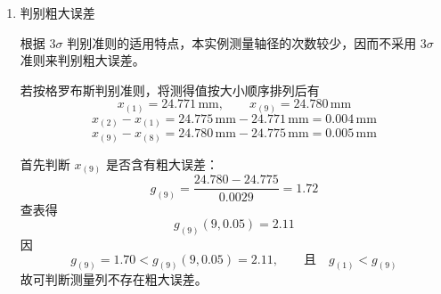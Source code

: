 \documentclass[UTF8,zihao=-4]{ctexart}
\begin{document}
\begin{enumerate}[label=\arabic*.]
    根据贝塞尔公式或别捷尔斯公式，求得测量列单次测量的标准差 $\sigma$ 为
    \begin{equation*}
        \sigma
        =
        \sqrt{\frac{\displaystyle\sum_{i=1}^{9}v_i^2}{n-1}}
        =
        \sqrt{\frac{0.000069}{8}}\,\mathrm{mm}
        =
        0.0029\,\mathrm{mm}
    \end{equation*}
    \begin{equation*}
        \sigma'
        =
        1.253
        \frac{\displaystyle\sum_{i=1}^{n}|v_i|}
        {\sqrt{n(n-1)}}
        =
        1.253\times
        \frac{0.021}{\sqrt{9\times8}}\,\mathrm{mm}
        =
        0.0031\,\mathrm{mm}
    \end{equation*}
    用两种方法计算的标准差比值为
    \begin{equation*}
        \frac{\sigma'}{\sigma}
        =
        \frac{0.0031}{0.0029}
        =
        1.069
        =
        1+u
    \end{equation*}
    \begin{equation*}
        u=0.069
    \end{equation*}
    因
    \begin{equation*}
        |u|
        =
        0.069
        <
        \frac{2}{\sqrt{n-1}}
        =
        \frac{2}{\sqrt{8}}
        \approx0.707
    \end{equation*}
    故同样可判断该测量列无系统误差存在。

    \item 判别粗大误差

    根据 $3\sigma$ 判别准则的适用特点，本实例测量轴径的次数较少，因而不采用 $3\sigma$ 准则来判别粗大误差。

    若按格罗布斯判别准则，将测得值按大小顺序排列后有
    \begin{equation*}
        x_{(1)}=24.771\,\mathrm{mm},
        \qquad
        x_{(9)}=24.780\,\mathrm{mm}
    \end{equation*}
    \begin{equation*}
        x_{(2)}-x_{(1)}
        =
        24.775\,\mathrm{mm}
        -
        24.771\,\mathrm{mm}
        =
        0.004\,\mathrm{mm}
    \end{equation*}
    \begin{equation*}
        x_{(9)}-x_{(8)}
        =
        24.780\,\mathrm{mm}
        -
        24.775\,\mathrm{mm}
        =
        0.005\,\mathrm{mm}
    \end{equation*}

    首先判断 $x_{(9)}$ 是否含有粗大误差：
    \begin{equation*}
        g_{(9)}
        =
        \frac{24.780-24.775}{0.0029}
        =
        1.72
    \end{equation*}
    查表得
    \begin{equation*}
        g_{(9)}(9,0.05)=2.11
    \end{equation*}
    因
    \begin{equation*}
        g_{(9)}=1.70<g_{(9)}(9,0.05)=2.11,
        \qquad
        \text{且}\quad
        g_{(1)}<g_{(9)}
    \end{equation*}
    故可判断测量列不存在粗大误差。


\end{enumerate}
\end{document}
